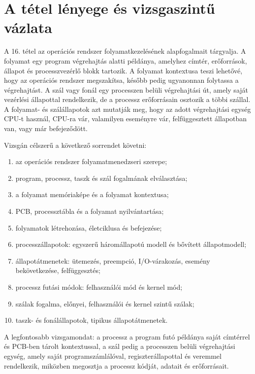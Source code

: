\section{A tétel lényege és vizsgaszintű vázlata}

\begin{summarybox}
A 16. tétel az operációs rendszer folyamatkezelésének alapfogalmait tárgyalja. A folyamat egy program végrehajtás alatti példánya, amelyhez címtér, erőforrások, állapot és processzvezérlő blokk tartozik. A folyamat kontextusa teszi lehetővé, hogy az operációs rendszer megszakítsa, később pedig ugyanonnan folytassa a végrehajtást. A szál vagy fonál egy processzen belüli végrehajtási út, amely saját vezérlési állapottal rendelkezik, de a processz erőforrásain osztozik a többi szállal. A folyamat- és szálállapotok azt mutatják meg, hogy az adott végrehajtási egység CPU-t használ, CPU-ra vár, valamilyen eseményre vár, felfüggesztett állapotban van, vagy már befejeződött.
\end{summarybox}

Vizsgán célszerű a következő sorrendet követni:

\begin{enumerate}
  \item az operációs rendszer folyamatmenedzseri szerepe;
  \item program, processz, taszk és szál fogalmának elválasztása;
  \item a folyamat memóriaképe és a folyamat kontextusa;
  \item PCB, processztábla és a folyamat nyilvántartása;
  \item folyamatok létrehozása, életciklusa és befejezése;
  \item processzállapotok: egyszerű háromállapotú modell és bővített állapotmodell;
  \item állapotátmenetek: ütemezés, preempció, I/O-várakozás, esemény bekövetkezése, felfüggesztés;
  \item processz futási módok: felhasználói mód és kernel mód;
  \item szálak fogalma, előnyei, felhasználói és kernel szintű szálak;
  \item taszk- és fonálállapotok, tipikus állapotátmenetek.
\end{enumerate}

A legfontosabb vizsgamondat: a processz a program futó példánya saját címtérrel és PCB-ben tárolt kontextussal, a szál pedig a processzen belüli végrehajtási egység, amely saját programszámlálóval, regiszterállapottal és veremmel rendelkezik, miközben megosztja a processz kódját, adatait és erőforrásait.

